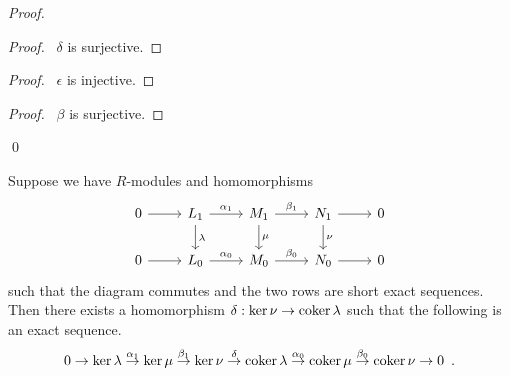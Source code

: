 \begin{proof}
\pf
{}
\begin{proof}
	\pf\ $\delta$ is surjective.
\end{proof}
\begin{proof}
	\pf\ $\epsilon$ is injective.
\end{proof}
\begin{proof}
	\pf\ $\beta$ is surjective.
\end{proof}
\qed
\end{proof}

\begin{thm}
Suppose we have $R$-modules and homomorphisms
\[ \begin{tikzcd}
0 \arrow[r] & L_1 \arrow[r,"\alpha_1"] \arrow[d,"\lambda"] & M_1 \arrow[r,"\beta_1"] \arrow[d,"\mu"] & N_1 \arrow[r] \arrow[d,"\nu"] & 0 \\
0 \arrow[r] & L_0 \arrow[r,"\alpha_0"] & M_0 \arrow[r,"\beta_0"] & N_0 \arrow[r] & 0
\end{tikzcd} \]
such that the diagram commutes and the two rows are short exact sequences. Then there exists a homomorphism $\delta : \ker \nu \rightarrow \operatorname{coker} \lambda$ such that the following is an exact sequence.
\[ 0 \rightarrow \ker \lambda \stackrel{\alpha_1}{\rightarrow} \ker \mu \stackrel{\beta_1}{\rightarrow} \ker \nu \stackrel{\delta}{\rightarrow} \operatorname{coker} \lambda \stackrel{\alpha_0}{\rightarrow} \operatorname{coker} \mu \stackrel{\beta_0}{\rightarrow} \operatorname{coker} \nu \rightarrow 0 \enspace . \]
\end{thm}

